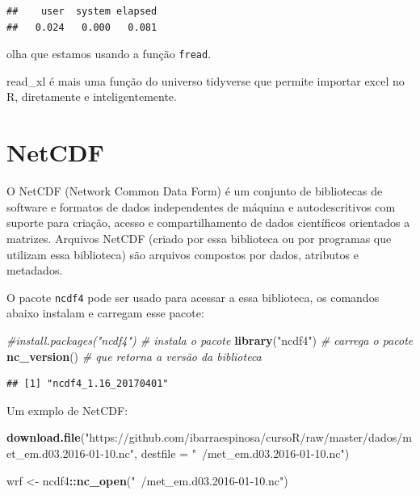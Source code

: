 \documentclass[]{book}
\newenvironment{Shaded}{\begin{snugshade}}{\end{snugshade}}
\newcommand{\KeywordTok}[1]{\textcolor[rgb]{0.13,0.29,0.53}{\textbf{#1}}}
\newcommand{\DataTypeTok}[1]{\textcolor[rgb]{0.13,0.29,0.53}{#1}}
\newcommand{\StringTok}[1]{\textcolor[rgb]{0.31,0.60,0.02}{#1}}
\newcommand{\CommentTok}[1]{\textcolor[rgb]{0.56,0.35,0.01}{\textit{#1}}}
\newcommand{\OperatorTok}[1]{\textcolor[rgb]{0.81,0.36,0.00}{\textbf{#1}}}
\newcommand{\NormalTok}[1]{#1}
\begin{document}
\begin{verbatim}
##    user  system elapsed 
##   0.024   0.000   0.081
\end{verbatim}

olha que estamos usando a função \texttt{fread}.

read\_xl é mais uma função do universo tidyverse que permite importar
excel no R, diretamente e inteligentemente.

\section{NetCDF}\label{netcdf}

O NetCDF (Network Common Data Form) é um conjunto de bibliotecas de
software e formatos de dados independentes de máquina e autodescritivos
com suporte para criação, acesso e compartilhamento de dados científicos
orientados a matrizes. Arquivos NetCDF (criado por essa biblioteca ou
por programas que utilizam essa biblioteca) são arquivos compostos por
dados, atributos e metadados.

O pacote \texttt{ncdf4} pode ser usado para acessar a essa biblioteca,
os comandos abaixo instalam e carregam esse pacote:

\begin{Shaded}
\begin{Highlighting}[]
\CommentTok{#install.packages("ncdf4") # instala o pacote}
\KeywordTok{library}\NormalTok{(}\StringTok{"ncdf4"}\NormalTok{)          }\CommentTok{# carrega o pacote}
\KeywordTok{nc_version}\NormalTok{()              }\CommentTok{# que retorna a versão da biblioteca}
\end{Highlighting}
\end{Shaded}

\begin{verbatim}
## [1] "ncdf4_1.16_20170401"
\end{verbatim}

Um exmplo de NetCDF:

\begin{Shaded}
\begin{Highlighting}[]
\KeywordTok{download.file}\NormalTok{(}\StringTok{"https://github.com/ibarraespinosa/cursoR/raw/master/dados/met_em.d03.2016-01-10.nc"}\NormalTok{, }\DataTypeTok{destfile =} \StringTok{"~/met_em.d03.2016-01-10.nc"}\NormalTok{)}
\end{Highlighting}
\end{Shaded}

\begin{Shaded}
\begin{Highlighting}[]
\NormalTok{wrf <-}\StringTok{ }\NormalTok{ncdf4}\OperatorTok{::}\KeywordTok{nc_open}\NormalTok{(}\StringTok{"~/met_em.d03.2016-01-10.nc"}\NormalTok{)}
\end{Highlighting}
\end{Shaded}
\end{document}
